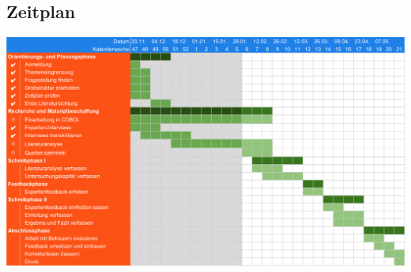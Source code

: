\clearpage
{}
\begin{landscape}
    \chapter{Zeitplan}
    \includegraphics[width=.9\linewidth]{Bilder/Zeitplan}
\end{landscape}
\restoregeometry